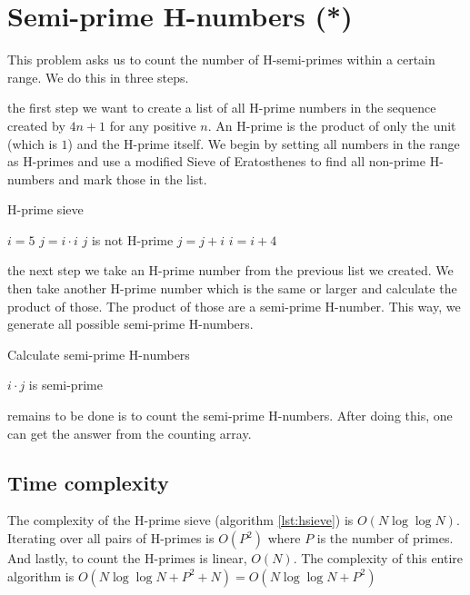 \documentclass[11pt,a4paper,twoside]{article}
\begin{document}
\section{Semi-prime H-numbers (*)}

This problem asks us to count the number of H-semi-primes within a certain 
range. We do this in three steps.

 the first step we want to create a list of all H-prime numbers in
the sequence created by $4n + 1$ for any positive $n$. An H-prime is the
product of only the unit (which is $1$) and the H-prime itself. We begin by
setting all numbers in the range as H-primes and use a modified Sieve of
Eratosthenes to find all non-prime H-numbers and mark those in the list.

\begin{algorithm}
    \caption{H-prime sieve}
    \label{lst:hsieve}
    \begin{algorithmic}
        \STATE $i = 5$
                \STATE $j = i \cdot i$
                    \STATE $j$ is not H-prime %
                    \STATE $j = j + i$
                \ENDWHILE
            \ENDIF
            \STATE $i = i + 4$
        \ENDWHILE
    \end{algorithmic}
\end{algorithm}

 the next step we take an H-prime number from the previous list we
created. We then take another H-prime number which is the same or larger and
calculate the product of those. The product of those are a semi-prime H-number.
This way, we generate all possible semi-prime H-numbers.

\begin{algorithm}
    \caption{Calculate semi-prime H-numbers}
    \label{Semi-prime H-numbers}
    \begin{algorithmic}
                \STATE $i \cdot j$ is semi-prime
            \ENDFOR
        \ENDFOR
    \end{algorithmic}
\end{algorithm}

 remains to be done is to count the semi-prime H-numbers. After
doing this, one can get the answer from the counting array.

\subsection{Time complexity}
The complexity of the H-prime sieve (algorithm \ref{lst:hsieve}) is
$O(N\log{\log{N}})$. Iterating over all pairs of H-primes is $O(P^2)$ where $P$
is the number of primes. And lastly, to count the H-primes is linear, $O(N)$.
The complexity of this entire algorithm is $O(N\log{\log{N}} + P^2 + N) =
O(N\log{\log{N}} + P^2)$
\end{document}

